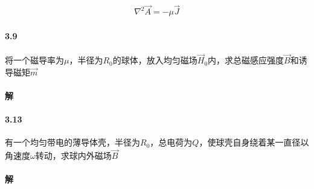 \documentclass{article}
\newcommand*{\Jmath}{J}
\begin{document}
\begin{equation*}
  \begin{aligned}
    \nabla^2 \vec{A} = - \mu \vec{\Jmath}
  \end{aligned}
\end{equation*}

\paragraph{3.9}

将一个磁导率为$\mu$，半径为$R_0$的球体，放入均匀磁场$\vec{H}_0$内，求总磁感应强度$\vec{B}$和诱导磁矩$\vec{m}$

\paragraph{解}


\paragraph{3.13}

有一个均匀带电的薄导体壳，半径为$R_0$，总电荷为$Q$，使球壳自身绕着某一直径以角速度$\omega$转动，求球内外磁场$\vec{B}$

\paragraph{解}
\end{document}
